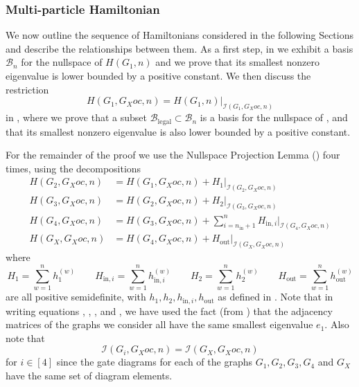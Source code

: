 \documentclass[../thesis-main/thesis-main]{subfiles}
\begin{document}
\subsubsection{Multi-particle Hamiltonian}
\label{sec:Building-up-the}

We now outline the sequence of Hamiltonians considered in the following Sections and describe the relationships between them. As a first step, in  we exhibit a basis $\mathcal{B}_{n}$ for the nullspace of $H(G_{1},n)$ and we prove that its smallest nonzero eigenvalue is lower bounded by a positive constant. We then discuss the restriction
\begin{equation}
  H(G_{1},G_Xoc,n)
  = H(G_{1},n)\big|_{\mathcal{I}\left(G_{1},G_Xoc,n\right)}
\label{eq:restriction}
\end{equation}
in , where we prove that a subset $\mathcal{B}_{\text{legal}}\subset\mathcal{B}_{n}$ is a basis for the nullspace of , and that its smallest nonzero eigenvalue is also lower bounded by a positive constant.

For the remainder of the proof we use the Nullspace Projection Lemma () four times, using the decompositions 
\begin{align}
H(G_{2},G_Xoc,n) & =H(G_{1},G_Xoc,n)+H_{1}\big|_{\mathcal{I}(G_{2},G_Xoc,n)}\label{eq:H_G2}\\
H(G_{3},G_Xoc,n) & =H(G_{2},G_Xoc,n)+H_{2}\big|_{\mathcal{I}(G_{3},G_Xoc,n)}\label{eq:H_G3}\\
H(G_{4},G_Xoc,n) & =H(G_{3},G_Xoc,n)+\sum_{i=n_{\text{in}}+1}^{n}H_{\text{in},i}\big|_{\mathcal{I}(G_{4},G_Xoc,n)}\label{eq:H_G4}\\
H(G_X,G_Xoc,n) & =H(G_{4},G_Xoc,n)+H_{\text{out}}\big|_{\mathcal{I}(G_X,G_Xoc,n)}\label{eq:H_GC}
\end{align}
where 
\begin{equation*}
H_{1}=\sum_{w=1}^{n}h_{1}^{(w)} \qquad H_{\text{in},i}=\sum_{w=1}^{n}h_{\text{in},i}^{(w)} \qquad 
H_{2}=\sum_{w=1}^{n}h_{2}^{(w)} \qquad  H_{\text{out}}=\sum_{w=1}^{n}h_{\text{out}}^{(w)}
\end{equation*}
are all positive semidefinite, with $h_{1},h_{2},h_{\text{in},i},h_{\text{out}}$ as defined in . Note that in writing equations , , , and , we have used the fact (from ) that the adjacency matrices of the graphs we consider all have the same smallest eigenvalue $e_{1}$. Also note that
\begin{equation} \mathcal{\mathcal{I}}\left(G_{i},G_Xoc,n\right)=\mathcal{\mathcal{I}}\left(G_X,G_Xoc,n\right) \end{equation} for $i\in[4]$ since the gate diagrams for each of the graphs $G_{1},G_{2},G_{3},G_{4}$ and $G_X$ have the same set of diagram elements.
\end{document}
